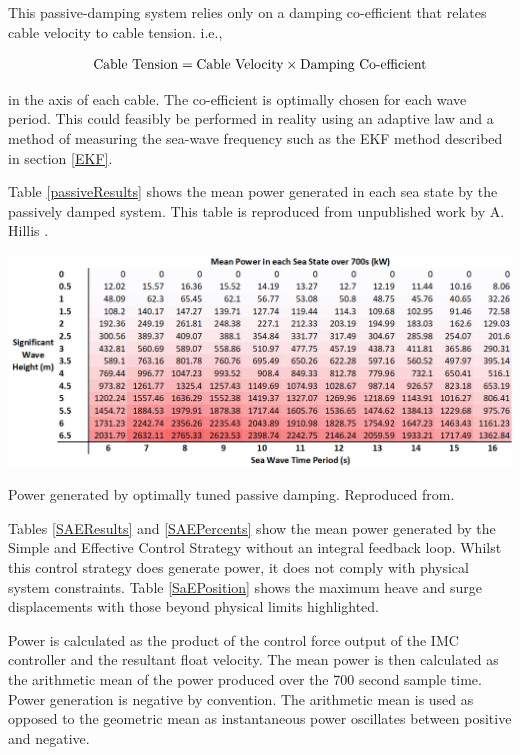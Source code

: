 \documentclass{report}
\begin{document}
This passive-damping system relies only on a damping co-efficient that relates cable velocity to cable tension. i.e.,

\[
\textup{Cable Tension} = \textup{Cable Velocity} \times \textup{Damping Co-efficient}
\]

in the axis of each cable. The co-efficient is optimally chosen for each wave period. This could feasibly be performed in reality using an adaptive law and a method of measuring the sea-wave frequency such as the EKF method described in section \ref{EKF}.

Table \ref{passiveResults} shows the mean power generated in each sea state by the passively damped system. This table is reproduced from unpublished work by A. Hillis \cite{andyMPC}.

\begin{table}
\hspace{-3cm}
\includegraphics[scale=0.7]{tables/passiveResults}
\caption{Power generated by optimally tuned passive damping. Reproduced from\cite{andyMPC}.}
\label{passiveResults}
\end{table}
\FloatBarrier

Tables \ref{SAEResults} and \ref{SAEPercents} show the mean power generated by the Simple and Effective Control Strategy without an integral feedback loop. Whilst this control strategy does generate power, it does not comply with physical system constraints. Table \ref{SaEPosition} shows the maximum heave and surge displacements with those beyond physical limits highlighted.

Power is calculated as the product of the control force output of the IMC controller and the resultant float velocity. The mean power is then calculated as the arithmetic mean of the power produced over the 700 second sample time. Power generation is negative by convention. The arithmetic mean is used as opposed to the geometric mean as instantaneous power oscillates between positive and negative.
\end{document}

